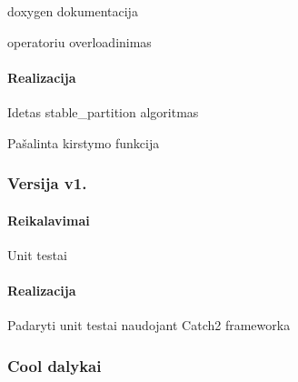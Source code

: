 \begin{DoxyEnumerate}
\item doxygen dokumentacija
\item operatoriu overload\textquotesingle{}inimas
\end{DoxyEnumerate}

\paragraph*{Realizacija}


\begin{DoxyItemize}
\item Idetas {\ttfamily stable\+\_\+partition} algoritmas
\item Pašalinta kirstymo funkcija
\end{DoxyItemize}

\subsubsection*{Versija v1.}

\paragraph*{Reikalavimai}


\begin{DoxyItemize}
\item Unit testai
\end{DoxyItemize}

\paragraph*{Realizacija}


\begin{DoxyItemize}
\item Padaryti unit testai naudojant Catch2 framework\textquotesingle{}a
\end{DoxyItemize}

\subsubsection*{Cool dalykai}


